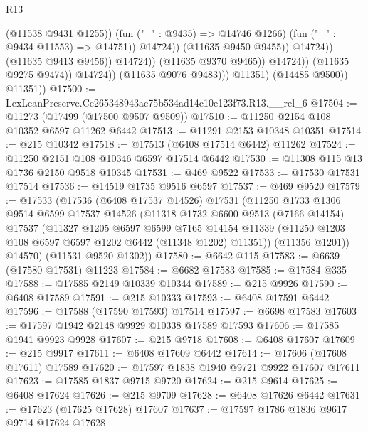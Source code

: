 \begin{lexlean}{R13}
\begin{coremodule}
                                                (@11538 @9431 @1255))
                                              (fun ("_" : @9435) => @14746 @1266)
                                              (fun ("_" : @9434 @11553) => @14751))
                                            @14724))
                                        (@11635 @9450 @9455))
                                      @14724))
                                  (@11635 @9413 @9456))
                                @14724))
                            (@11635 @9370 @9465))
                          @14724))
                      (@11635 @9275 @9474))
                    @14724))
                (@11635 @9076 @9483)))
            @11351)
          (@14485 @9500))
        @11351))
@17500 := LexLeanPreserve.Cc265348943ac75b534ad14c10e123f73.R13.__rel_6
@17504 := @11273 (@17499 (@17500 @9507 @9509))
@17510 := @11250 @2154 @108 @10352 @6597 @11262 @6442
@17513 := @11291 @2153 @10348 @10351
@17514 := @215 @10342
@17518 := @17513 (@6408 @17514 @6442) @11262
@17524 := @11250 @2151 @108 @10346 @6597 @17514 @6442
@17530 := @11308 @115 @13 @1736 @2150 @9518 @10345
@17531 := @469 @9522
@17533 := @17530 @17531 @17514
@17536 := @14519 @1735 @9516 @6597
@17537 := @469 @9520
@17579 := @17533
    (@17536
      (@6408 @17537 @14526)
      @17531
      (@11250
        @1733
        @1306
        @9514
        @6599
        @17537
        @14526
        (@11318
          @1732
          @6600
          @9513
          (@7166 @14154)
          @17537
          (@11327
            @1205
            @6597
            @6599
            @7165
            @14154
            @11339
            (@11250 @1203 @108 @6597 @6597 @1202 @6442 (@11348 @1202) @11351))
          (@11356 @1201))
        @14570)
      (@11531 @9520 @1302))
@17580 := @6642 @115
@17583 := @6639 (@17580 @17531) @11223
@17584 := @6682 @17583
@17585 := @17584 @335
@17588 := @17585 @2149 @10339 @10344
@17589 := @215 @9926
@17590 := @6408 @17589
@17591 := @215 @10333
@17593 := @6408 @17591 @6442
@17596 := @17588 (@17590 @17593) @17514
@17597 := @6698 @17583
@17603 := @17597 @1942 @2148 @9929 @10338 @17589 @17593
@17606 := @17585 @1941 @9923 @9928
@17607 := @215 @9718
@17608 := @6408 @17607
@17609 := @215 @9917
@17611 := @6408 @17609 @6442
@17614 := @17606 (@17608 @17611) @17589
@17620 := @17597 @1838 @1940 @9721 @9922 @17607 @17611
@17623 := @17585 @1837 @9715 @9720
@17624 := @215 @9614
@17625 := @6408 @17624
@17626 := @215 @9709
@17628 := @6408 @17626 @6442
@17631 := @17623 (@17625 @17628) @17607
@17637 := @17597 @1786 @1836 @9617 @9714 @17624 @17628

\end{coremodule}
\end{lexlean}
